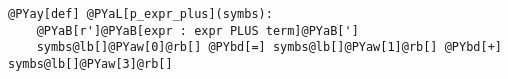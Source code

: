 \begin{Verbatim}[commandchars=@\[\]]
@PYay[def] @PYaL[p_expr_plus](symbs):
    @PYaB[r']@PYaB[expr : expr PLUS term]@PYaB[']
    symbs@lb[]@PYaw[0]@rb[] @PYbd[=] symbs@lb[]@PYaw[1]@rb[] @PYbd[+] symbs@lb[]@PYaw[3]@rb[]
\end{Verbatim}
